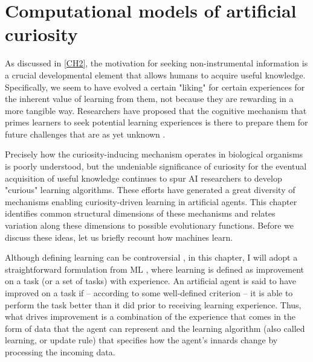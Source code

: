 \chapter{Computational models of artificial curiosity}\label{CH3}

As discussed in \cref{CH2}, the motivation for seeking non-instrumental information is a crucial developmental element that allows humans to acquire useful knowledge. Specifically, we seem to have evolved a certain "liking" for certain experiences for the inherent value of learning from them, not because they are rewarding in a more tangible way. Researchers have proposed that the cognitive mechanism that primes learners to seek potential learning experiences is there to prepare them for future challenges that are as yet unknown \parencite{oudeyer_computational_2018,gopnik_childhood_2020}.

Precisely how the curiosity-inducing mechanism operates in biological organisms is poorly understood, but the undeniable significance of curiosity for the eventual acquisition of useful knowledge continues to spur \ac{AI} researchers to develop "curious" learning algorithms. These efforts have generated a great diversity of mechanisms enabling curiosity-driven learning in artificial agents. This chapter identifies common structural dimensions of these mechanisms and relates variation along these dimensions to possible evolutionary functions. Before we discuss these ideas, let us briefly recount how machines learn.

Although defining learning can be controversial \parencite{barron_embracing_2015}, in this chapter, I will adopt a straightforward formulation from \ac{ML} \parencite{jordan_machine_2015}, where learning is defined as improvement on a task (or a set of tasks) with experience. An artificial agent is said to have improved on a task if -- according to some well-defined criterion -- it is able to perform the task better than it did prior to receiving learning experience. Thus, what drives improvement is a combination of the experience that comes in the form of data that the agent can represent and the learning algorithm (also called learning, or update rule) that specifies how the agent’s innards change by processing the incoming data.

